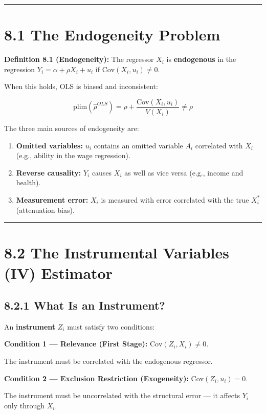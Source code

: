 \medskip\hrule\medskip

\section{8.1 The Endogeneity Problem}

\textbf{Definition 8.1 (Endogeneity):} The regressor $X_i$ is \textbf{endogenous} in the regression $Y_i = \alpha + \rho X_i + u_i$ if $\text{Cov}(X_i, u_i) \neq 0$.

When this holds, OLS is biased and inconsistent:

\[
\text{plim}(\hat{\rho}^{OLS}) = \rho + \frac{\text{Cov}(X_i, u_i)}{V(X_i)} \neq \rho
\]

The three main sources of endogeneity are:

\begin{enumerate}
\item \textbf{Omitted variables:} $u_i$ contains an omitted variable $A_i$ correlated with $X_i$ (e.g., ability in the wage regression).
\item \textbf{Reverse causality:} $Y_i$ causes $X_i$ as well as vice versa (e.g., income and health).
\item \textbf{Measurement error:} $X_i$ is measured with error correlated with the true $X_i^*$ (attenuation bias).
\end{enumerate}

\medskip\hrule\medskip

\section{8.2 The Instrumental Variables (IV) Estimator}

\subsection{8.2.1 What Is an Instrument?}

An \textbf{instrument} $Z_i$ must satisfy two conditions:

\textbf{Condition 1 --- Relevance (First Stage):} $\text{Cov}(Z_i, X_i) \neq 0$.

The instrument must be correlated with the endogenous regressor.

\textbf{Condition 2 --- Exclusion Restriction (Exogeneity):} $\text{Cov}(Z_i, u_i) = 0$.

The instrument must be uncorrelated with the structural error --- it affects $Y_i$ only through $X_i$.

